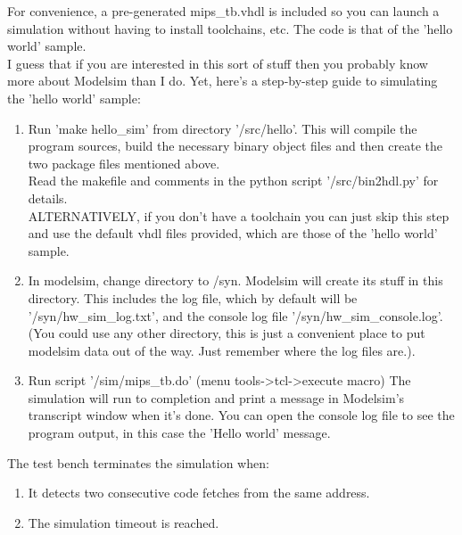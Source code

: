 \documentclass[11pt]{article}
\begin{document}
    For convenience, a pre-generated mips\_tb.vhdl is included so you can launch
    a simulation without having to install toolchains, etc. The code is that
    of the 'hello world' sample.\\

    I guess that if you are interested in this sort of stuff then you probably
    know more about Modelsim than I do. Yet, here's a step-by-step guide to
    simulating the 'hello world' sample:
    
\begin{enumerate}
    \item Run 'make hello\_sim' from directory '/src/hello'.
        This will compile the program sources, build the necessary binary object
        files and then create the two package files mentioned above.\\
        Read the makefile and comments in the python script '/src/bin2hdl.py'
        for details.\\

        ALTERNATIVELY, if you don't have a toolchain you can just skip this
        step and use the default vhdl files provided, which are those of the
        'hello world' sample.\\

    \item In modelsim, change directory to /syn. Modelsim will create its stuff 
        in this directory. This includes the
        log file, which by default will be '/syn/hw\_sim\_log.txt', and the 
        console log file '/syn/hw\_sim\_console.log'.\\
        (You could use any other directory, this is just a convenient place to
        put modelsim data out of the way. Just remember where the log files
        are.).

    \item Run script '/sim/mips\_tb.do' (menu tools-\textgreater tcl-\textgreater execute macro)
        The simulation will run to completion and print a message in Modelsim's 
        transcript window when it's done. You can open the console log file 
        to see the program output, in this case the 'Hello world' message.\\

\end{enumerate}
    
    The test bench terminates the simulation when:
    
\begin{enumerate}
    
    \item It detects two consecutive code fetches from the same address.
    \item The simulation timeout is reached.
    
\end{enumerate}
    
\end{document}
